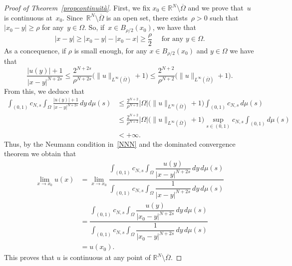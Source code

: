\documentclass[12pt,a4paper,intlimits,sumlimits]{amsart}
\def \R {\mathbb{R}}
\theoremstyle{definition}
\theoremstyle{plain}
\numberwithin{equation}{section}
\renewcommand{\leq}{\leqslant}
\renewcommand{\le}{\leqslant}
\renewcommand{\geq}{\geqslant}
\begin{document}
\begin{proof}[Proof of Theorem~\ref{propcontinuità}]
First, we fix $x_0\in \R^N\setminus \overline{\Omega}$ and we 
prove that~$u$ is continuous at~$x_0$. Since~$\R^N\setminus \overline{\Omega}$ is an open set, there exists~$\rho>0$ such that~$|x_0-y|\geq \rho$ for any~$y\in \Omega$.
So, if~$x\in B_{\rho/2}(x_0)$, we have that
\[
|x-y|\geq |x_0-y|-|x_0-x|\geq \frac{\rho}{2}\quad\mbox{ for any } y\in\Omega.
\]
As a concequence, if $\rho$ is small enough,
for any $x\in B_{\rho/2}(x_0)$ and $y\in \Omega$
we have that 
\[
\frac{|u(y)|+1}{|x-y|^{N+2s}}
\leq \frac{2^{N+2s}}{\rho^{N+2s}}\Big(\|u\|_{L^\infty(\overline{\Omega})}+1\Big)
\leq \frac{2^{N+2}}{\rho^{N+2}}\Big(\|u\|_{L^\infty(\overline{\Omega})}+1\Big).
\]
{F}rom this, we deduce that 
\[
\begin{split}
\int_{(0,1)}c_{N,s}\int_\Omega \frac{|u(y)|+1}{|x-y|^{N+2s}}\,dy\,d\mu(s)
&\leq \frac{2^{N+2}}{\rho^{N+2}}|\Omega|\Big(\|u\|_{L^\infty(\overline{\Omega})}+1\Big)\int_{(0,1)}c_{N,s}\,d\mu(s)\\
&\le\frac{2^{N+2}}{\rho^{N+2}}|\Omega|\Big(\|u\|_{L^\infty(\overline{\Omega})}+1\Big) \sup_{s\in (0, 1)} c_{N, s} \int_{(0, 1)} d\mu(s)\\
&<+\infty.
\end{split}
\]
Thus, by the Neumann condition in~\eqref{NNN} and the dominated convergence theorem we obtain that
\[
\begin{split}
\lim_{x\to x_0}u(x) &=
\lim_{x\to x_0} \dfrac{\displaystyle \int_{(0,1)}c_{N,s}\int_\Omega \dfrac{u(y)}{|x-y|^{N+2s}}\,dy\,d\mu(s)}{\displaystyle\int_{(0,1)}c_{N,s}\int_\Omega \dfrac{1}{|x-y|^{N+2s}}\,dy\,d\mu(s)}\\
&=\dfrac{\displaystyle \int_{(0,1)}c_{N,s}\int_\Omega \dfrac{u(y)}{|x_0-y|^{N+2s}}\,dy\,d\mu(s)}{\displaystyle\int_{(0,1)}c_{N,s}\int_\Omega \dfrac{1}{|x_0-y|^{N+2s}}\,dy\,d\mu(s)}\\
&=u(x_0).
\end{split}
\]
This proves that $u$ is continuous at any point of 
$\R^N\setminus \overline{\Omega}$.


\end{proof}
\end{document}

